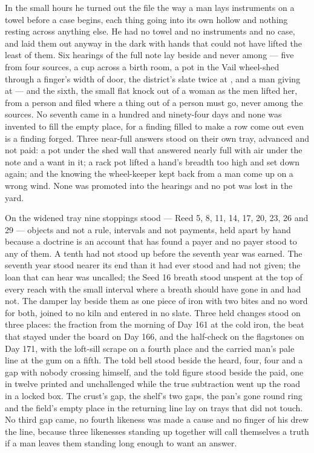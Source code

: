 In the small hours he turned out the file the way a man lays instruments on a towel before a case begins, each thing going into its own hollow and nothing resting across anything else. He had no towel and no instruments and no case, and laid them out anyway in the dark with hands that could not have lifted the least of them. Six hearings of the full note lay beside and never among --- five from four sources, a cup across a birth room, a pot in the Vail wheel-shed through a finger's width of door, the district's slate twice at , and a man giving at  --- and the sixth, the small flat knock out of a woman as the men lifted her, from a person and filed where a thing out of a person must go, never among the sources. No seventh came in a hundred and ninety-four days and none was invented to fill the empty place, for a finding filled to make a row come out even is a finding forged. Three near-full answers stood on their own tray, advanced and not paid: a pot under the shed wall that answered nearly full with air under the note and a want in it; a rack pot lifted a hand's breadth too high and set down again; and the knowing the wheel-keeper kept back from a man come up on a wrong wind. None was promoted into the hearings and no pot was lost in the yard.

On the widened tray nine stoppings stood --- Reed 5, 8, 11, 14, 17, 20, 23, 26 and 29 --- objects and not a rule, intervals and not payments, held apart by hand because a doctrine is an account that has found a payer and no payer stood to any of them. A tenth had not stood up before the seventh year was earned. The seventh year stood nearer its end than it had ever stood and had not given; the loan that can hear was uncalled; the Seed 16 breath stood unspent at the top of every reach with the small interval where a breath should have gone in and had not. The damper lay beside them as one piece of iron with two bites and no word for both, joined to no kiln and entered in no slate. Three held changes stood on three places: the fraction from the morning of Day 161 at the cold iron, the beat that stayed under the board on Day 166, and the half-check on the flagstones on Day 171, with the loft-sill scrape on a fourth place and the carried man's pale line at the gum on a fifth. The told bell stood beside the heard, four, four and a gap with nobody crossing himself, and the told figure stood beside the paid, one in twelve printed and unchallenged while the true subtraction went up the road in a locked box. The crust's gap, the shelf's two gaps, the pan's gone round ring and the field's empty place in the returning line lay on trays that did not touch. No third gap came, no fourth likeness was made a cause and no finger of his drew the line, because three likenesses standing up together will call themselves a truth if a man leaves them standing long enough to want an answer.

